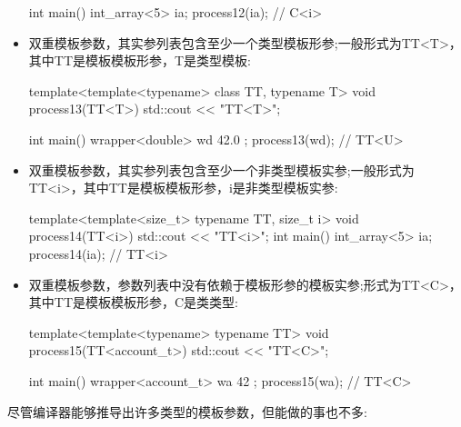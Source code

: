 \begin{itemize}
\begin{cpp}
int main()
{
	int_array<5> ia{};
	process12(ia); // C<i>
}
\end{cpp}

\item
双重模板参数，其实参列表包含至少一个类型模板形参;一般形式为TT<T>，其中TT是模板模板形参，T是类型模板:

\begin{cpp}
template<template<typename> class TT, typename T>
void process13(TT<T>) { std::cout << "TT<T>\n"; }

int main()
{
	wrapper<double> wd{ 42.0 };
	process13(wd); // TT<U>
}
\end{cpp}

\item
双重模板参数，其实参列表包含至少一个非类型模板实参;一般形式为TT<i>，其中TT是模板模板形参，i是非类型模板实参:

\begin{cpp}
template<template<size_t> typename TT, size_t i>
void process14(TT<i>) { std::cout << "TT<i>\n"; }
int main()
{
	int_array<5> ia{};
	process14(ia); // TT<i>
}
\end{cpp}

\item
双重模板参数，参数列表中没有依赖于模板形参的模板实参;形式为TT<C>，其中TT是模板模板形参，C是类类型:

\begin{cpp}
template<template<typename> typename TT>
void process15(TT<account_t>) { std::cout << "TT<C>\n"; }

int main()
{
	wrapper<account_t> wa{ {42} };
	process15(wa); // TT<C>
}
\end{cpp}
\end{itemize}

尽管编译器能够推导出许多类型的模板参数，但能做的事也不多:

